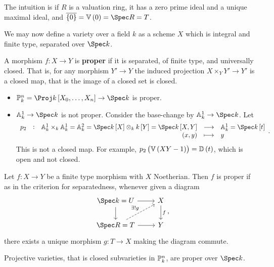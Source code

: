 
The intuition is if $ R $ is a valuation ring, it has a zero prime ideal and a unique maximal ideal, and $ \overline{\cbr{0}} = \VV\br{0} = \Spec R = T $.

\begin{remark*}
We may now define a variety over a field $ k $ as a scheme $ X $ which is integral and finite type, separated over $ \Spec k $.
\end{remark*}

\begin{definition*}
A morphism $ f : X \to Y $ is \textbf{proper} if it is separated, of finite type, and universally closed. That is, for any morphism $ Y' \to Y $ the induced projection $ X \times_Y Y' \to Y' $ is a closed map, that is the image of a closed set is closed.
\end{definition*}

\begin{example*}
\hfill
\begin{itemize}
\item $ \PP_k^n = \Proj k\sbr{X_0, \dots, X_n} \to \Spec k $ is proper.
\item $ \AA_k^1 \to \Spec k $ is not proper. Consider the base-change by $ \AA_k^1 \to \Spec k $. Let
$$ \function[p_2]{\AA_k^1 \times_k \AA_k^1 = \AA_k^2 = \Spec k\sbr{X} \otimes_k k\sbr{Y} = \Spec k\sbr{X, Y}}{\AA_k^1 = \Spec k\sbr{t}}{\br{x, y}}{y}. $$
This is not a closed map. For example, $ p_2\br{\VV\br{XY - 1}} = \DD\br{t} $, which is open and not closed.
\end{itemize}
\end{example*}

\begin{theorem}
Let $ f : X \to Y $ be a finite type morphism with $ X $ Noetherian. Then $ f $ is proper if as in the criterion for separatedness, whenever given a diagram
$$
\begin{tikzcd}
\Spec k = U \arrow{r} \arrow{d} & X \arrow{d}{f} \\
\Spec R = T \arrow[dashed]{ur}{\exists !g} \arrow{r} & Y
\end{tikzcd},
$$
there exists a unique morphism $ g : T \to X $ making the diagram commute.
\end{theorem}

\begin{example*}
Projective varieties, that is closed subvarieties in $ \mathbb{P}_k^n $, are proper over $ \Spec k $.
\end{example*}

